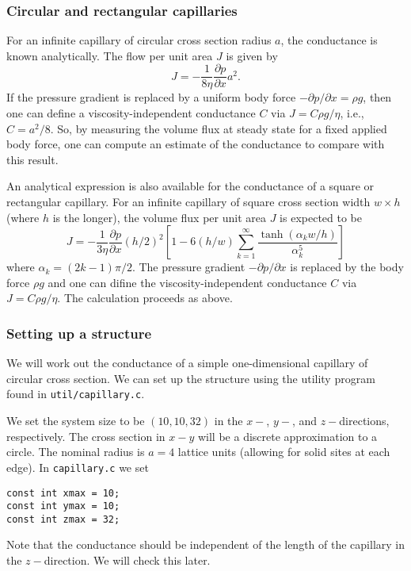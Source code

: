 \subsubsection{Circular and rectangular capillaries}

\label{section-examples-exact-conductance}

For an infinite  capillary of circular cross section radius $a$,
the conductance is known analytically\cite{papanastasiou}. The
flow per unit area $J$ is given by
\begin{equation}
J = - \frac{1}{8\eta} \frac{\partial p}{ \partial x} a^2. 
\end{equation}
If the pressure gradient is replaced by a uniform body force
$-\partial p/ \partial x = \rho g$, then one can define a
viscosity-independent conductance $C$ via $ J = C \rho g / \eta$,
i.e., $C = a^2/8$. So, by measuring the volume flux at steady state
for a fixed applied body force, one can compute an estimate of the
conductance to compare with this result.

An analytical expression is also available for the conductance
of a square or rectangular capillary. For an infinite capillary
of square cross section width $w \times h$ (where $h$ is the
longer),
the volume flux per unit area $J$ is expected to be
\cite{papanastasiou,edo1}
\begin{equation}
J = - \frac{1}{3\eta} \frac{\partial p}{\partial x} (h/2)^2
\left[
1 - 6(h/w) \sum_{k=1}^{\infty} \frac{\tanh(\alpha_k w/h)}{\alpha_k^5} 
\right]
\end{equation}
where $\alpha_k = (2k - 1)\pi/2$. The pressure gradient
$-\partial p / \partial x$ is replaced by the body force $\rho g$ and
one can difine the viscosity-independent conductance $C$ via
$J = C\rho g / \eta$. The calculation proceeds as above.

\subsubsection{Setting up a structure}

We will work out the conductance of a simple one-dimensional capillary
of circular cross section. We can set up the structure using the
utility program found in \texttt{util/capillary.c}.

We set the system size to be $(10,10,32)$ in the $x-$, $y-$, and
$z-$directions, respectively. The cross section in $x-y$ will be
a discrete  approximation to a circle. The nominal radius is
$a = 4$ lattice units (allowing for solid sites at each edge).
In \texttt{capillary.c} we
set
\begin{lstlisting}
const int xmax = 10;
const int ymax = 10;
const int zmax = 32;
\end{lstlisting}
Note that the conductance should be independent of the length of the
capillary in the $z-$direction. We will check this later.

